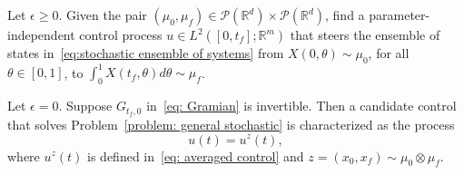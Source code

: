 \documentclass[10pt,a4paper]{amsart}
\newcommand{\R}{\mathbb{R}}
\begin{document}
\begin{problem}\label{problem: general stochastic}
Let $\epsilon\geq 0$. Given the pair $(\mu_0,\mu_f)\in\mathcal{P}(\R^d)\times\mathcal{P}(\R^d)$, find a parameter-independent control process $u\in L^2([0,t_f];\mathbb{R}^m)$ that steers the ensemble of states in~\eqref{eq:stochastic ensemble of systems} from $X(0,\theta)\sim\mu_0$, for all $\theta\in[0,1]$, to $\int_0^1X(t_f,\theta)d\theta\sim\mu_f$. %
\end{problem}

\begin{theorem}\label{thm: deterministic control}
Let $\epsilon=0$.  Suppose $G_{t_f,0}$ in~\eqref{eq: Gramian} is invertible. Then a candidate control that solves Problem~\ref{problem: general stochastic} is characterized as the process
\begin{equation}\label{eq: proposed noiseless control process}
u(t)=u^z(t),    
\end{equation}
where $u^z(t)$ is defined in~\eqref{eq: averaged control} and $z=(x_0,x_f)\sim\mu_0\otimes\mu_f$.
\end{theorem}
\end{document}
